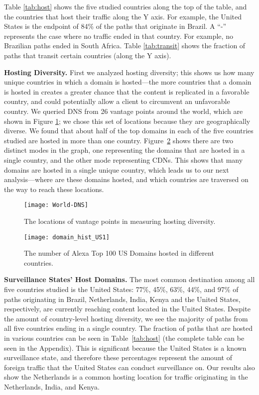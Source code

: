 Table \ref{tab:host} shows the five studied countries along the top of the table, and the countries that host their traffic along the Y axis.  For example, the United States is the endpoint of 84\% of the paths that originate in Brazil.  A ``-'' represents the case where no traffic ended in that country.  For example, no Brazilian paths ended in South Africa. Table \ref{tab:transit} shows the fraction of paths that transit certain countries (along the Y axis).

{\bf Hosting Diversity.}
First we analyzed hosting diversity; this shows us how many unique countries in which a domain is hosted---the more countries that a domain is hosted in creates a greater chance that the content is replicated in a favorable country, and could potentially allow a client to circumvent an unfavorable country.  We queried DNS from 26 vantage points around the world, which are shown in Figure \ref{fig:world}; we chose this set of locations because they are geographically diverse.  We found that about half of the top domains in each of the five countries studied are hosted in more than one country.  Figure~\ref{fig:host_diversity} shows there are two distinct modes in the graph, one representing the domains that are hosted in a single country, and the other mode representing CDNs.  This shows that many domains are hosted in a single unique country, which leads us to our next analysis---where are these domains hosted, and which countries are traversed on the way to reach these locations.

\begin{figure}
\centering
\texttt{[image: World-DNS]}
\caption{The locations of vantage points in measuring hosting diversity.}
\label{fig:world}
\end{figure}

\begin{figure}
\centering
\texttt{[image: domain\_hist\_US1]}
\caption{The number of Alexa Top 100 US Domains hosted in different countries.}
\label{fig:host_diversity}
\end{figure}

{\bf Surveillance States' Host Domains.}
The most common destination among all five countries studied is the United States: 77\%, 45\%, 63\%, 44\%, and 97\% of paths originating in Brazil, Netherlands, India, Kenya and the United States, respectively, are currently reaching content located in the United States. Despite the amount of country-level hosting diversity, we see the majority of paths from all five countries ending in a single country.  The fraction of paths that are hosted in various countries can be seen in Table~\ref{tab:host} (the complete table can be seen in the Appendix).  This is significant because the United States is a known surveillance state, and therefore these percentages represent the amount of foreign traffic that the United States can conduct surveillance on.  Our results also show the Netherlands is a common hosting location for traffic originating in the Netherlands, India, and Kenya.

